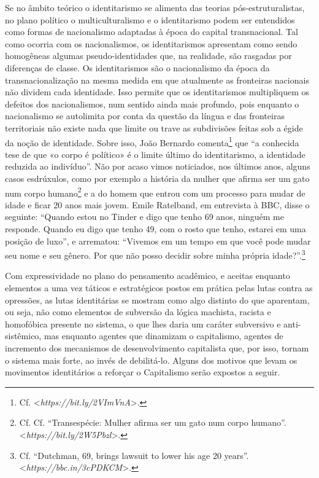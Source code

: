 Se no âmbito teórico o identitarismo se alimenta das teorias
pós-estruturalistas, no plano político o multiculturalismo e o
identitarismo podem ser entendidos como formas de nacionalismo adaptadas
à época do capital transnacional. Tal como ocorria com os nacionalismos,
os identitarismos apresentam como sendo homogêneas algumas
pseudo-identidades que, na realidade, são rasgadas por diferenças de
classe. Os identitarismos são o nacionalismo da época da
transnacionalização na mesma medida em que atualmente as fronteiras
nacionais não dividem cada identidade. Isso permite que os
identitarismos multipliquem os defeitos dos nacionalismos, num sentido
ainda mais profundo, pois enquanto o nacionalismo se autolimita por
conta da questão da língua e das fronteiras territoriais não existe nada
que limite ou trave as subdivisões feitas sob a égide da noção de
identidade. Sobre isso, João Bernardo comenta\footnote{Cf.
  \textless{}\emph{https://bit.ly/2VImVnA}\textgreater{}.} que
``a conhecida tese de que «o corpo é político» é o limite último do
identitarismo, a identidade reduzida ao indivíduo''. Não por acaso vimos
noticiados, nos últimos anos, alguns casos esdrúxulos, como por exemplo
a história da mulher que afirma ser um gato num corpo humano\footnote{Cf.
  Cf. ``Transespécie: Mulher afirma ser um gato num corpo humano''.
  \textless{}\emph{https://bit.ly/2W5Pbzl}\textgreater{}.} e a do homem que
entrou com um processo para mudar de idade e ficar 20 anos mais jovem.
Emile Ratelband, em entrevista à BBC, disse o seguinte: ``Quando estou
no Tinder e digo que tenho 69 anos, ninguém me responde. Quando eu digo
que tenho 49, com o rosto que tenho, estarei em uma posição de luxo'', e
arrematou: ``Vivemos em um tempo em que você pode mudar seu nome e seu
gênero. Por que não posso decidir sobre minha própria
idade?''.\footnote{Cf. ``Dutchman, 69, brings lawsuit to lower his age
  20 years''. \textless{}\emph{https://bbc.in/3cPDKCM}\textgreater{}.}

Com expressividade no plano do pensamento acadêmico, e aceitas enquanto
elementos a uma vez táticos e estratégicos postos em prática pelas lutas
contra as opressões, as lutas identitárias se mostram como algo distinto
do que aparentam, ou seja, não como elementos de subversão da lógica
machista, racista e homofóbica presente no sistema, o que lhes daria um
caráter subversivo e anti-sistêmico, mas enquanto agentes que dinamizam
o capitalismo, agentes de incremento dos mecanismos de desenvolvimento
capitalista que, por isso, tornam o sistema mais forte, ao invés de
debilitá-lo. Alguns dos motivos que levam os movimentos identitários a
reforçar o Capitalismo serão expostos a seguir.

